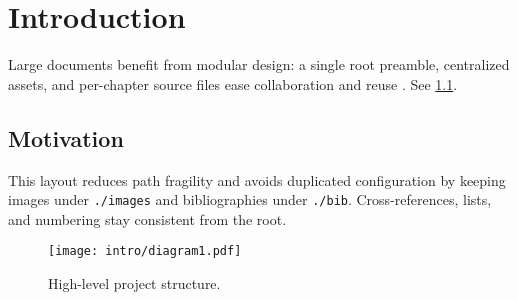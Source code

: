 \documentclass[../../main.tex]{subfiles}
\begin{document}
\chapter{Introduction}
Large documents benefit from modular design: a single root preamble, centralized assets, and per-chapter source files ease collaboration and reuse \parencite{lamport1986latex,knuth1990texbook}. See \cref{fig:intro-diagram}. 

\section{Motivation}
This layout reduces path fragility and avoids duplicated configuration by keeping images under \texttt{./images} and bibliographies under \texttt{./bib}. Cross-references, lists, and numbering stay consistent from the root.

\begin{figure}[ht]
  \centering
  \texttt{[image: intro/diagram1.pdf]}
  \caption{High-level project structure.}
  \label{fig:intro-diagram}
\end{figure}
\end{document}
